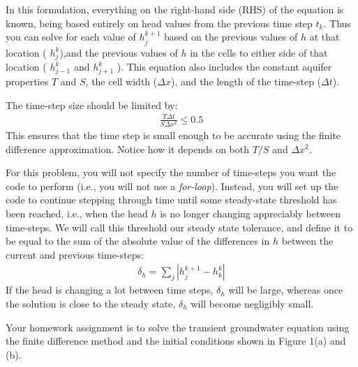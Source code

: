 \documentclass[11pt, oneside]{article}   	%
\begin{document}
In this formulation, everything on the right-hand side (RHS) of the equation is known, being based entirely on head values from the previous time step $t_k$. Thus you can solve for each value of  $h_j^{k+1}$ based on the previous values of $h$ at that location ( $h_j^{k}$),and  the previous values of $h$ in the cells to either side of that location ( $h_{j-1}^{k}$ and $h_{j+1}^{k}$ ).
 This equation also includes the constant aquifer properties $T$ and $S$, the cell width ($\Delta x$), and the length of the time-step ($\Delta t$). 

The time-step size should be limited by:
\begin{eqnarray}
 \frac{T\Delta t}{S\Delta x^2} \le 0.5
\end{eqnarray}
This ensures that the time step is small enough to be accurate using the finite difference approximation. Notice how it depends on both $T/S$ and $\Delta x^2$.

For this problem, you will not specify the number of time-steps you want the code to perform (i.e., you will not use a {\it for-loop}).  Instead, you will set up the code to continue stepping through time until some steady-state threshold has been reached, i.e., when the head $h$ is no longer changing appreciably between time-steps.  We will call this threshold our steady state tolerance, and define it to be equal to the sum of the absolute value of the differences in $h$ between the current and previous time-steps:
\begin{eqnarray}
\delta_h = \sum_j | h_j^{k+1} - h_k^k |
\end{eqnarray}
If the head is changing a lot between time steps, $\delta_h$ will be large, whereas once the solution is close to the steady state,  $\delta_h$ will become negligibly small.

Your homework assignment is to solve the transient groundwater equation using the finite difference method and the initial conditions shown in Figure 1(a) and (b). 
\end{document}
